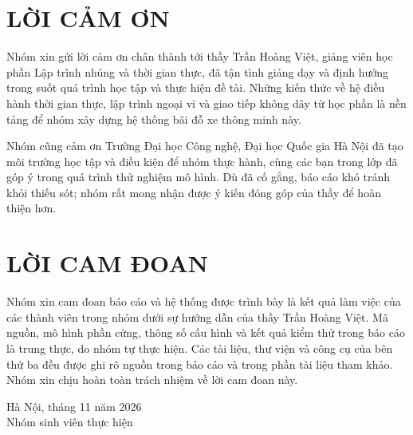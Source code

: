 \documentclass[12pt,letterpaper]{report}
\newcommand{\tenmon}{Lập trình nhúng và thời gian thực}
\newcommand{\giangvien}{Trần Hoàng Việt}
\begin{document}


\chapter*{LỜI CẢM ƠN}
Nhóm xin gửi lời cảm ơn chân thành tới thầy \giangvien{}, giảng viên học phần \tenmon{},
đã tận tình giảng dạy và định hướng trong suốt quá trình học tập và thực hiện đề tài.
Những kiến thức về hệ điều hành thời gian thực, lập trình ngoại vi và giao tiếp không dây
từ học phần là nền tảng để nhóm xây dựng hệ thống bãi đỗ xe thông minh này.

Nhóm cũng cảm ơn Trường Đại học Công nghệ, Đại học Quốc gia Hà Nội đã tạo môi trường học
tập và điều kiện để nhóm thực hành, cùng các bạn trong lớp đã góp ý trong quá trình thử
nghiệm mô hình. Dù đã cố gắng, báo cáo khó tránh khỏi thiếu sót; nhóm rất mong nhận được
ý kiến đóng góp của thầy để hoàn thiện hơn.


\chapter*{LỜI CAM ĐOAN}
Nhóm xin cam đoan báo cáo và hệ thống được trình bày là kết quả làm việc của các thành viên
trong nhóm dưới sự hướng dẫn của thầy \giangvien{}. Mã nguồn, mô hình phần cứng, thông số cấu hình
và kết quả kiểm thử trong báo cáo là trung thực, do nhóm tự thực hiện. Các tài liệu, thư
viện và công cụ của bên thứ ba đều được ghi rõ nguồn trong báo cáo và trong phần tài liệu
tham khảo. Nhóm xin chịu hoàn toàn trách nhiệm về lời cam đoan này.

\vspace{1cm}
\noindent\hfill\begin{minipage}{7cm}
  \centering
  Hà Nội, tháng 11 năm 2026\\
  Nhóm sinh viên thực hiện\par
\end{minipage}\par


{\tableofcontents}
\end{document}
